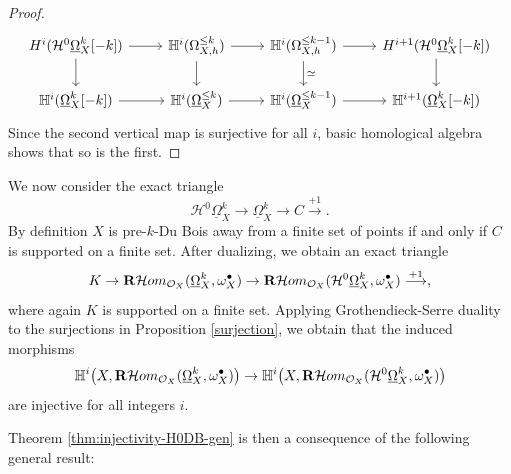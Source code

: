 \documentclass[11pt]{amsart}
\theoremstyle{definition}
\theoremstyle{plain}
\renewcommand{\H}{\mathcal H}
\renewcommand{\O}{\mathcal O}
\newcommand{\HH}{\mathbb H}
\newcommand{\RHom}{{\bf R} \H om}
\newcommand{\DB}{\underline{\Omega}} %
\begin{document}
\begin{proof}
 \[\begin{tikzcd}
	H^i (\H^0 \DB_X^k [-k]) & \HH^i (\Omega_{X, h}^{\le k})&  \HH^i (\Omega_{X, h}^{\le k-1})& H^{i+ 1} (\H^0 \DB_X^k [-k])  \\
	 \HH^i (\DB_X^k [-k]) &  \HH^i (\DB_X^{\le k}) &   \HH^i (\DB_X^{\le k-1})  &  \HH^{i+1} (\DB_X^k [-k]) 
	\arrow[from=1-1, to=1-2]
	\arrow[from=1-2, to=1-3]
	\arrow[from=1-3, to=1-4]
	\arrow[from=2-1, to=2-2]
	\arrow[from=2-2, to=2-3]
	\arrow[from=1-1, to=2-1]
	\arrow[from=1-2, to=2-2]
	\arrow["\simeq", from=1-3, to=2-3]
	\arrow[from=2-3, to=2-4]
	\arrow[from=1-4, to=2-4]
    \end{tikzcd}\]
Since the second vertical map is surjective for all $i$, basic homological algebra shows that so is the first. 
\end{proof}

We now consider the exact triangle
$$\H^0 \DB_X^k \to \DB_X^k \to  C \overset{+1}{\longrightarrow}.$$
By definition $X$ is pre-$k$-Du Bois away from a finite set of points if and only if $C$ is supported on a finite set. 
After dualizing, we obtain an exact triangle 
$$K \to  \RHom_{\O_X}(\DB_X^k,\omega_X^{\bullet}) \to \RHom_{\O_X}(\H^0\DB_X^k,\omega_X^{\bullet}) \overset{+1}{\longrightarrow},$$
where again $K$ is supported on a finite set.
Applying Grothendieck-Serre duality to the surjections in Proposition \ref{surjection}, we obtain that the induced morphisms 
$$\HH^i \big(X, \RHom_{\O_X}(\DB_X^k,\omega_X^{\bullet})\big)\to \HH^i \big(X, \RHom_{\O_X}(\H^0\DB_X^k,\omega_X^{\bullet})\big)$$
are injective for all integers $i$.

Theorem \ref{thm:injectivity-H0DB-gen} is then a consequence of the following general result:
\end{document}
